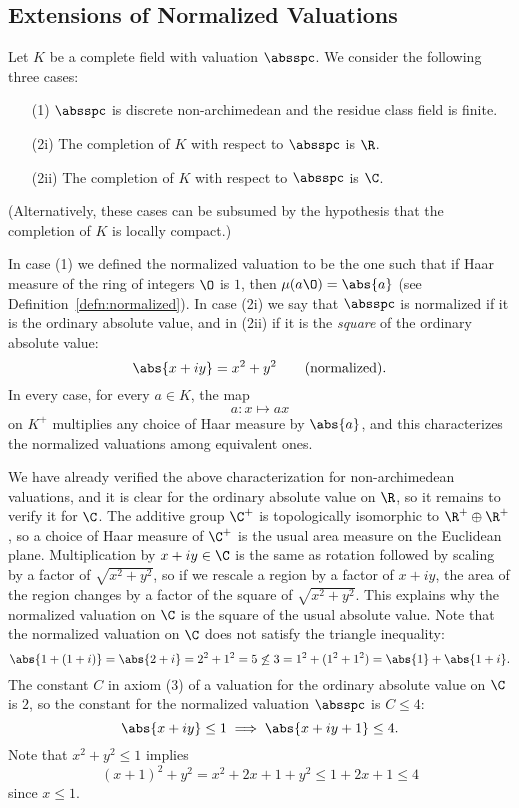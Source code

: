 \documentclass[11pt]{book}
\begin{document}
\begin{ch}
\section{Extensions of Normalized Valuations}
Let $K$ be a complete field with valuation $\absspc$.
We consider the following three cases:
\begin{itemize}
\item[(1)] $\absspc$ is discrete non-archimedean and the
residue class field is finite.
\item[(2i)] The completion of $K$ with respect to $\absspc$ is $\R$.
\item[(2ii)] The completion of $K$ with respect to $\absspc$ is $\C$.
\end{itemize}
(Alternatively, these cases can be subsumed by the hypothesis that
the completion of $K$ is locally compact.)

In case (1) we defined the normalized valuation to
be the one such that if Haar measure of the ring of integers $\O$ is $1$,
then $\mu(a\O) = \abs{a}$ (see Definition~\ref{defn:normalized}).
In case (2i) we say that $\absspc$ is normalized if it is the ordinary
absolute value, and in (2ii) if it is the {\em square} of the ordinary
absolute value:
$$\abs{x+iy} = x^2 + y^2 \qquad \text{(normalized)}.$$
In every case, for every $a\in K$,  the map
$$
   a: x \mapsto a x
$$
on $K^+$ multiplies any choice of Haar measure by $\abs{a}$, and this characterizes
the normalized valuations among equivalent ones.

We have already verified the above characterization for
non-archimedean valuations, and it is clear for the ordinary absolute
value on $\R$, so it remains to verify it for $\C$.  The additive
group $\C^+$ is topologically isomorphic to $\R^+ \oplus \R^+$, so a
choice of Haar measure of $\C^+$ is the usual area measure on the
Euclidean plane.  Multiplication by $x+iy\in \C$ is the same as
rotation followed by scaling by a factor of $\sqrt{x^2+y^2}$, so if we
rescale a region by a factor of $x+iy$, the area of the region changes
by a factor of the square of $\sqrt{x^2+y^2}$. This explains why the
normalized valuation on $\C$ is the square of the usual absolute
value.  Note that the normalized valuation on $\C$ does not satisfy
the triangle inequality:
$$
\abs{1 + (1+i)} = \abs{2+i} = 2^2 + 1^2 = 5 \not\leq
 3= 1^2 + (1^2 + 1^2) =  \abs{1} + \abs{1+i}.
$$
The constant $C$ in axiom (3) of a valuation for the ordinary
absolute value on $\C$ is $2$, so the constant for the normalized
valuation $\absspc$ is $C\leq 4$:
$$
 \abs{x+iy} \leq 1 \implies \abs{x+iy+1} \leq 4.
$$
Note that $x^2 +y^2 \leq 1$ implies $$(x+1)^2 + y^2
 = x^2 + 2x + 1 + y^2 \leq 1 + 2x + 1 \leq 4$$ since
$x\leq 1$.


\end{ch}
\end{document}
